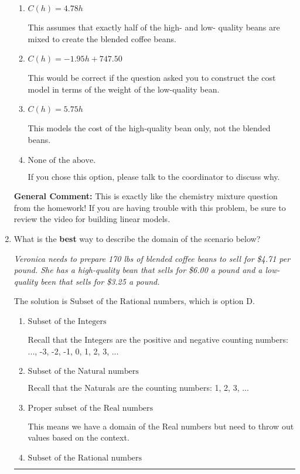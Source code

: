 \documentclass{extbook}[14pt]
\newcommand{\litem}[1]{\item #1

\rule{\textwidth}{0.4pt}}
\begin{document}
\begin{enumerate}
{\begin{enumerate}[label=\Alph*.]
* This is the correct option since the questions asked you to construct the cost model in terms of the weight of the high-quality bean.
\item \( C(h) = 4.78 h \)

This assumes that exactly half of the high- and low- quality beans are mixed to create the blended coffee beans.
\item \( C(h) = -1.95 h + 747.50 \)

This would be correct if the question asked you to construct the cost model in terms of the weight of the low-quality bean.
\item \( C(h) = 5.75 h \)

This models the cost of the high-quality bean only, not the blended beans.
\item \( \text{None of the above.} \)

If you chose this option, please talk to the coordinator to discuss why.
\end{enumerate}

\textbf{General Comment:} This is exactly like the chemistry mixture question from the homework! If you are having trouble with this problem, be sure to review the video for building linear models.
}
\litem{
What is the \textbf{best} way to describe the domain of the scenario below?

\begin{center}
    \textit{ Veronica needs to prepare 170 lbs of blended coffee beans to sell for \$4.71 per pound. She has a high-quality bean that sells for \$6.00 a pound and a low-quality been that sells for \$3.25 a pound. }
\end{center}


The solution is \( \text{Subset of the Rational numbers} \), which is option D.\begin{enumerate}[label=\Alph*.]
\item \( \text{Subset of the Integers} \)

Recall that the Integers are the positive and negative counting numbers: ..., -3, -2, -1, 0, 1, 2, 3, ... 
\item \( \text{Subset of the Natural numbers} \)

Recall that the Naturals are the counting numbers: 1, 2, 3, ...
\item \( \text{Proper subset of the Real numbers} \)

This means we have a domain of the Real numbers but need to throw out values based on the context.
\item \( \text{Subset of the Rational numbers} \)


\end{enumerate}}
\end{enumerate}
\end{document}
